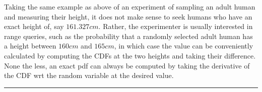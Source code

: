 \begin{enumerate}[5a.]
	Taking the same example as above of an experiment of sampling an adult human and measuring their height, it does not make sense to seek humans who have an exact height of, say $161.327cm$. Rather, the experimenter is usually interested in range queries, such as the probability that a randomly selected adult human has a height between $160cm$ and $165cm$, in which case the value can be conveniently calculated by computing the CDFs at the two heights and taking their difference. None the less, an exact pdf can always be computed by taking the derivative of the CDF wrt the random variable at the desired value.
\end{enumerate}

\noindent\rule{\textwidth}{1pt}